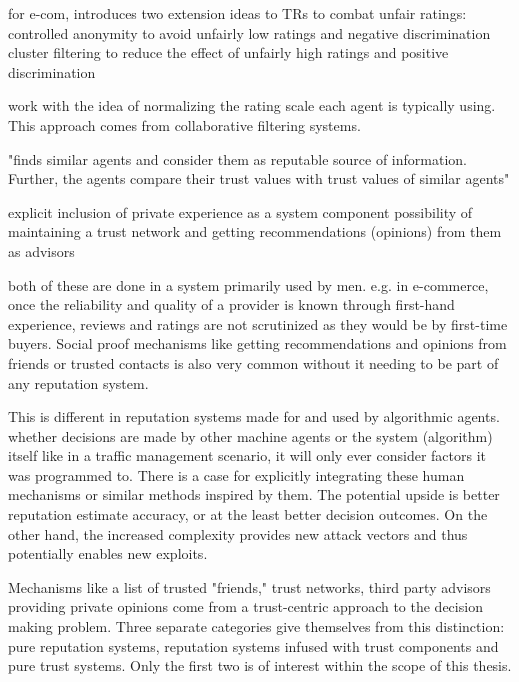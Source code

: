 \documentclass[%
    ]{\PathToTumTemplate/thesis/tum_thesis}
\begin{document}
\cite{dellarocas_immunizing_2000} for e-com, introduces two extension ideas to TRs to combat unfair ratings:
controlled anonymity to avoid unfairly low ratings and negative discrimination
cluster filtering to reduce the effect of unfairly high ratings and positive discrimination

\cite{margaris_improving_2017}\cite{margaris_improving_2018} work with the idea of normalizing the rating scale each agent is typically using. This approach comes from collaborative filtering systems.

\cite{zupancic_qade_2015}
"finds similar agents and consider them as reputable source of information. Further, the agents compare their trust values with trust values of similar agents"



explicit inclusion of private experience as a system component
possibility of maintaining a trust network and getting recommendations (opinions) from them as advisors

both of these are done in a system primarily used by men. e.g. in e-commerce, once the reliability and quality of a provider is known through first-hand experience, reviews and ratings are not scrutinized as they would be by first-time buyers. Social proof mechanisms like getting recommendations and opinions from friends or trusted contacts is also very common without it needing to be part of any reputation system. 

This is different in reputation systems made for and used by algorithmic agents. whether decisions are made by other machine agents or the system (algorithm) itself like in a traffic management scenario, it will only ever consider factors it was programmed to. There is a case for explicitly integrating these human mechanisms or similar methods inspired by them. The potential upside is better reputation estimate accuracy, or at the least better decision outcomes. On the other hand, the increased complexity provides new attack vectors and thus potentially enables new exploits.

Mechanisms like a list of trusted "friends," trust networks, third party advisors providing private opinions come from a trust-centric approach to the decision making problem. Three separate categories give themselves from this distinction: pure reputation systems, reputation systems infused with trust components and pure trust systems. Only the first two is of interest within the scope of this thesis.
\end{document}
